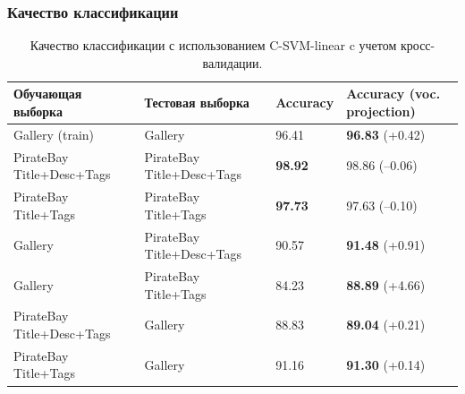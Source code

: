 \documentclass{beamer}
\begin{document}
\begin{frame}
\frametitle{Качество классификации}
\begin{table}
\tiny

\centering
\begin{tabular}{|l|l|l|l|}

\hline
\bf Обучающая выборка & \bf Тестовая выборка & \bf Accuracy  &
\textbf{Accuracy (voc. projection)} \\ \hline

Gallery (train) & Gallery  & 96.41 & \textbf{96.83} (+0.42) \\
PirateBay Title+Desc+Tags & PirateBay Title+Desc+Tags &  \textbf{98.92} &  98.86 (--0.06)\\
PirateBay Title+Tags & PirateBay Title+Tags & \textbf{97.73} & 97.63 (--0.10) \\
Gallery & PirateBay Title+Desc+Tags & 90.57 & \textbf{91.48} (+0.91) \\
\alert{Gallery}  & \alert{PirateBay Title+Tags}  & \alert{84.23} & \alert{\textbf{88.89}} \alert{(+4.66)} \\
PirateBay Title+Desc+Tags & Gallery  & 88.83 & \textbf{89.04} (+0.21) \\
PirateBay Title+Tags & Gallery & 91.16 & \textbf{91.30} (+0.14) \\
\hline

\end{tabular}
\caption{ Качество классификации с использованием C-SVM-linear c учетом
кросс-валидации.
}
\label{tbl:results2}

\end{table}
\end{frame}








\end{document}
